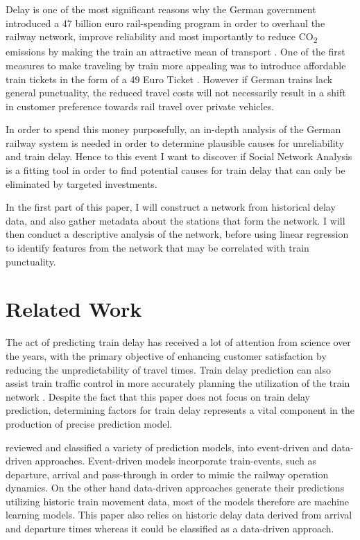 \documentclass[12pt,a4paper]{article}
\begin{document}
Delay is one of the most significant reasons why the German government introduced a 47 billion euro rail-spending program in order to overhaul the railway network, improve reliability and most importantly to reduce CO\textsubscript{2} emissions by making the train an attractive mean of transport \citep{Scally2023}. 
One of the first measures to make traveling by train more appealing was to introduce affordable train tickets in the form of a 49 Euro Ticket \citep{DW2023}. However if German trains lack general punctuality, the reduced travel costs will not necessarily result in a shift in customer preference towards rail travel over private vehicles.

In order to spend this money purposefully, an in-depth analysis of the German railway system is needed in order to determine plausible causes for unreliability and train delay. 
Hence to this event I want to discover if Social Network Analysis is a fitting tool in order to find potential causes for train delay that can only be eliminated by targeted investments. 

In the first part of this paper, I will construct a network from historical delay data, and also gather metadata about the stations that form the network. 
I will then conduct a descriptive analysis of the network, before using linear regression to identify features from the network that may be correlated with train punctuality.

\maketitle
\section{\label{sec:Related Work}Related Work}

The act of predicting train delay has received a lot of attention from science over the years, with the primary objective of enhancing customer satisfaction by reducing the unpredictability of travel times. 
Train delay prediction can also assist train traffic control in more accurately planning the utilization of the train network \citep[p.~1]{Spanninger2022}. 
Despite the fact that this paper does not focus on train delay prediction, determining factors for train delay represents a vital component in the production of precise prediction model.

\cite{Spanninger2022} reviewed and classified a variety of prediction models, into event-driven and data-driven approaches. 
Event-driven models incorporate train-events, such as departure, arrival and pass-through in order to mimic the railway operation dynamics. 
On the other hand data-driven approaches generate their predictions utilizing historic train movement data, most of the models therefore are machine learning models. 
This paper also relies on historic delay data derived from arrival and departure times whereas it could be classified as a data-driven approach. 
\end{document}
